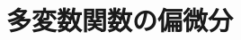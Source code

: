 \documentclass[../../topic_calculus]{subfiles}
\begin{document}
\chapter{多変数関数の偏微分}



\end{document}
